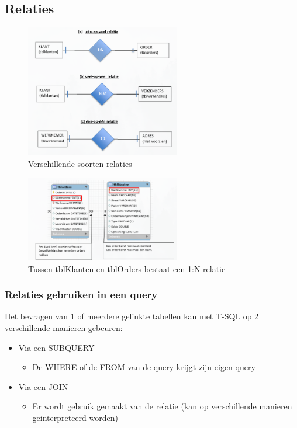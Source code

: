 \documentclass{article}
\begin{document}
\subsection{Relaties}

\begin{figure}[H]
    \centering
    \includegraphics[width=0.6\textwidth]{Screenshot_20200226_143314.png}
    \caption{Verschillende soorten relaties}
\end{figure}

\begin{figure}[H]
    \centering
    \includegraphics[width=0.6\textwidth]{Screenshot_20200226_144349.png}
    \caption{Tussen tblKlanten en tblOrders bestaat een 1:N relatie}
\end{figure}

\subsubsection{Relaties gebruiken in een query}
Het bevragen van 1 of meerdere gelinkte tabellen kan met T-SQL op 2 verschillende manieren gebeuren:

\begin{itemize}
    \item Via een SUBQUERY
    \begin{itemize}
        \item De WHERE of de FROM van de query krijgt zijn eigen query
    \end{itemize}
    \item Via een JOIN
    \begin{itemize}
        \item Er wordt gebruik gemaakt van de relatie (kan op verschillende manieren geinterpreteerd worden)
    \end{itemize}
\end{itemize}
\end{document}
